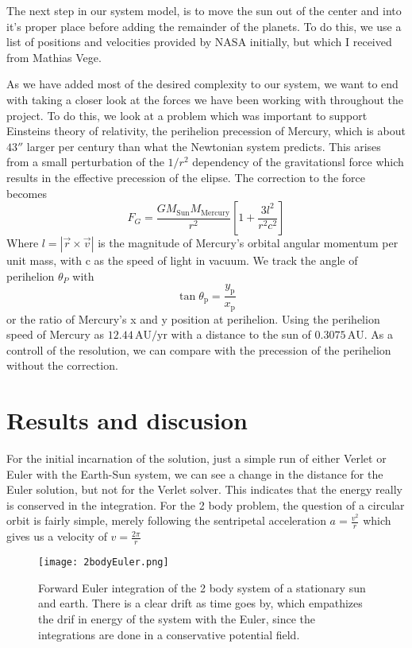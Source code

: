 \documentclass[10pt, twocolumn]{revtex4-1}
\begin{document}
The next step in our system model, is to move the sun out of the center and into it's proper place before adding the remainder of the planets. To do this, 
we use a list of positions and velocities provided by NASA initially, but which I received from Mathias Vege\cite{MathiasPlanetvalues}.


As we have added most of the desired complexity to our system, we want to end with taking a closer look at the forces we have been working with throughout the 
project. To do this, we look at a problem which was important to support Einsteins theory of relativity, the perihelion precession of Mercury, which is about
$43''$ larger per century than what the Newtonian system predicts. This arises from a small perturbation of the $1/r^2$ dependency of the gravitationsl 
force which results in the effective precession of the elipse. The correction to the force becomes 
\[
F_G = \frac{GM_\mathrm{Sun}M_\mathrm{Mercury}}{r^2}\left[1 + \frac{3l^2}{r^2c^2}\right]
\]
Where $l=|\vec{r}\times\vec{v}|$ is the magnitude of Mercury's orbital angular momentum per unit mass, with c as the speed of light in vacuum. We track the
angle of perihelion $\theta_P$ with 
\[
\tan \theta_\mathrm{p} = \frac{y_\mathrm{p}}{x_\mathrm{p}}
\]
or the ratio of Mercury's x and y position at perihelion. Using the perihelion speed of Mercury as $12.44\,\mathrm{AU}/\mathrm{yr}$ with a distance to the 
sun of $0.3075\,\mathrm{AU}$. As a controll of the resolution, we can compare with the precession of the perihelion without the correction. 


\section{Results and discusion}

For the initial incarnation of the solution, just a simple run of either Verlet or Euler with the Earth-Sun system, we can see a change in the distance
for the Euler solution, but not for the Verlet solver. This indicates that the energy really is conserved in the integration. For the 2 body problem, the
question of a circular orbit is fairly simple, merely following the sentripetal acceleration $a = \frac{v^2}{r}$ which gives us a velocity of 
$v = \frac{2\pi }{r}$

\begin{figure}[hbtp]
    \texttt{[image: 2bodyEuler.png]}
    \caption{Forward Euler integration of the 2 body system of a stationary sun and earth. 
        There is a clear drift as time goes by, which empathizes the drif in energy of the 
        system with the Euler, since the integrations are done in a conservative potential
        field.} 
    \label{}
\end{figure}
\end{document}
